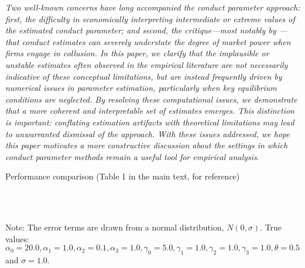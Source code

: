 \documentclass[11pt, a4paper]{article}
\theoremstyle{remark}
\begin{document}
\begin{enumerate}
\begin{itemize}
        \textit{Two well-known concerns have long accompanied the conduct parameter approach: first, the difficulty in economically interpreting intermediate or extreme values of the estimated conduct parameter; and second, the critique—most notably by \cite{corts1999conduct}—that conduct estimates can severely understate the degree of market power when firms engage in collusion. In this paper, we clarify that the implausible or unstable estimates often observed in the empirical literature are not necessarily indicative of these conceptual limitations, but are instead frequently driven by numerical issues in parameter estimation, particularly when key equilibrium conditions are neglected. By resolving these computational issues, we demonstrate that a more coherent and interpretable set of estimates emerges. This distinction is important: conflating estimation artifacts with theoretical limitations may lead to unwarranted dismissal of the approach. With these issues addressed, we hope this paper motivates a more constructive discussion about the settings in which conduct parameter methods remain a useful tool for empirical analysis.}
    \end{itemize}
\end{enumerate}

\begin{table}[!htbp]
  \begin{center}
      \caption{Performance comparison (Table 1 in the main text, for reference)}
      \label{tb:loglinear_loglinear_sigma_1_simultaneous_non_constraint_theta_constraint_bias_rmse} 
      \\
    \\
  \end{center}
  \footnotesize
  Note: The error terms are drawn from a normal distribution, $N(0, \sigma)$. True values: $\alpha_0=20.0,\alpha_1=1.0,\alpha_2=0.1,\alpha_3=1.0,\gamma_0=5.0,\gamma_1=1.0,\gamma_2=1.0,\gamma_3=1.0,\theta=0.5$ and $\sigma=1.0$. %
\end{table} 
\end{document}
